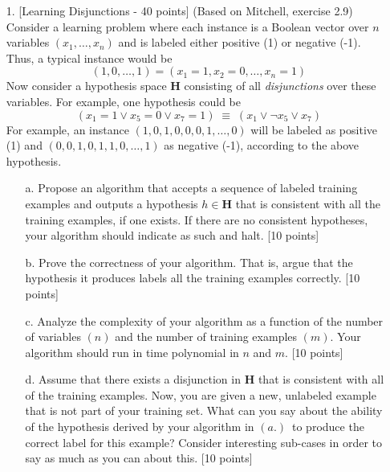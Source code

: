 \begin{enumerate}

\item[1.] [Learning Disjunctions - 40 points] (Based on Mitchell, exercise 2.9)\\
Consider a learning problem where each instance is a Boolean vector over $n$
variables $(x_1, \ldots, x_n)$ and is labeled either positive (1) or negative
(-1).  Thus, a typical instance would be
\begin{displaymath}
(1, 0, \ldots, 1) = (x_1 = 1, x_2 = 0, \ldots, x_n = 1)
\end{displaymath}
Now consider a hypothesis space ${\mathbf H}$ consisting of all {\em
  disjunctions} over these variables.  For example, one hypothesis
could be
\begin{displaymath}
(x_1 = 1 \vee x_5 = 0 \vee x_7 = 1) \; \equiv \; (x_1 \vee \neg x_5 \vee x_7)
\end{displaymath}
For example, an instance $(1, 0, 1, 0, 0, 0, 1, \ldots, 0)$ will be labeled
as positive (1) and $(0, 0, 1, 0, 1, 1, 0, \ldots, 1)$ as negative (-1),
according to the above hypothesis.

\begin{enumerate}
\item[a.]
Propose an algorithm that accepts a sequence of labeled training examples
and outputs a hypothesis $h \in \mathbf{H}$ that is consistent with all the training examples,
if one exists.  If there are no consistent hypotheses, your algorithm should
indicate as such and halt. [10 points]

\item[b.]
Prove the correctness of your algorithm.  That is, argue that the hypothesis
it produces labels all the training examples correctly. [10 points]

\item[c.]
Analyze the complexity of your algorithm as a function of the number of
variables $(n)$ and the number of training examples $(m)$.  Your algorithm
should run in time polynomial in $n$ and $m$. [10 points]

\item[d.]  Assume that there exists a disjunction in ${\mathbf H}$
  that is consistent with all of the training examples.  Now, you are
  given a new, unlabeled example that is not part of your training
  set.  What can you say about the ability of the hypothesis derived
  by your algorithm in $(a.)$~to produce the correct label for this
  example?  Consider interesting sub-cases in order to say as much as
  you can about this. [10 points]
  

\end{enumerate}
\end{enumerate}
